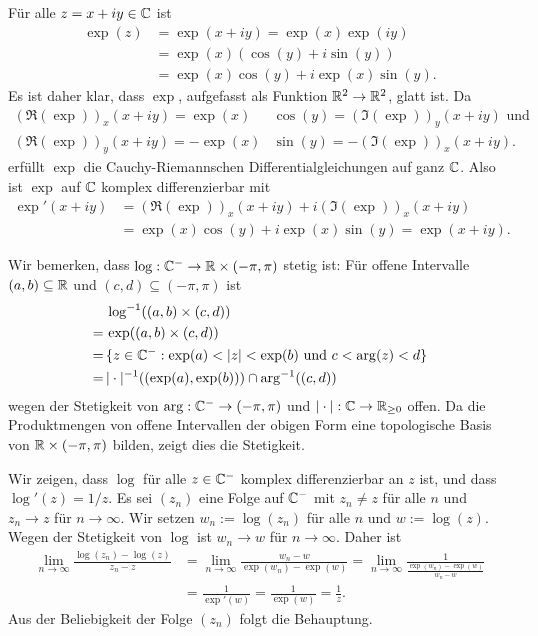 \documentclass[a4paper,10pt]{article}
\begin{document}
\subsection{}
Für alle $z = x+iy \in \mathbb{C}$ ist
\begin{align*}
 \exp(z)
 &= \exp(x+iy) = \exp(x) \exp(iy) \\
 &= \exp(x)(\cos(y) + i\sin(y)) \\
 &= \exp(x)\cos(y) + i\exp(x)\sin(y). 
\end{align*}
Es ist daher klar, dass $\exp$, aufgefasst als Funktion $\mathbb{R}^2 \to \mathbb{R}^2$, glatt ist. Da
\begin{align*}
 (\Re(\exp))_x(x+iy) = \exp(x)&\cos(y) = (\Im(\exp))_y(x+iy) \text{ und} \\
 (\Re(\exp))_y(x+iy) = -\exp(x)&\sin(y) = -(\Im(\exp))_x(x+iy).
\end{align*}
erfüllt $\exp$ die Cauchy-Riemannschen Differentialgleichungen auf ganz $\mathbb{C}$. Also ist $\exp$ auf $\mathbb{C}$ komplex differenzierbar mit
\begin{align*}
 \exp'(x+iy)
 &= (\Re(\exp))_x(x+iy) + i(\Im(\exp))_x(x+iy) \\
 &= \exp(x)\cos(y) + i\exp(x)\sin(y)
 = \exp(x+iy).
\end{align*}

Wir bemerken, dass $\log : \mathbb{C}^- \to \mathbb{R} \times (-\pi,\pi)$ stetig ist: Für offene Intervalle $(a,b) \subseteq \mathbb{R}$ und $(c,d) \subseteq (-\pi,\pi)$ ist
\begin{align*}
  &\,\log^{-1}((a,b) \times (c,d)) \\
 =&\, \exp((a,b) \times (c,d)) \\
 =&\, \{z \in \mathbb{C}^- : \exp(a) < |z| < \exp(b) \text{ und } c < \arg(z) < d \} \\
 =&\, |\cdot|^{-1}((\exp(a),\exp(b))) \cap \arg^{-1}((c,d))
\end{align*}
wegen der Stetigkeit von $\arg : \mathbb{C}^- \to (-\pi,\pi)$ und $|\cdot| : \mathbb{C} \to \mathbb{R}_{\geq 0}$ offen. Da die Produktmengen von offene Intervallen der obigen Form eine topologische Basis von $\mathbb{R} \times (-\pi,\pi)$ bilden, zeigt dies die Stetigkeit.

Wir zeigen, dass $\log$ für alle $z \in \mathbb{C}^-$ komplex differenzierbar an $z$ ist, und dass $\log'(z) = 1/z$. Es sei $(z_n)$ eine Folge auf $\mathbb{C}^-$ mit $z_n \neq z$ für alle $n$ und $z_n \to z$ für $n \to \infty$. Wir setzen $w_n := \log(z_n)$ für alle $n$ und $w := \log(z)$. Wegen der Stetigkeit von $\log$ ist $w_n \to w$ für $n \to \infty$. Daher ist
\begin{align*}
 \lim_{n \to \infty} \frac{\log(z_n) - \log(z)}{z_n -z}
 &= \lim_{n \to \infty} \frac{w_n - w}{\exp(w_n) - \exp(w)}
 = \lim_{n \to \infty} \frac{1}{\frac{\exp(w_n)-\exp(w)}{w_n-w}} \\
 &= \frac{1}{\exp'(w)}
 = \frac{1}{\exp(w)}
 = \frac{1}{z}.
\end{align*}
Aus der Beliebigkeit der Folge $(z_n)$ folgt die Behauptung.
\end{document}
